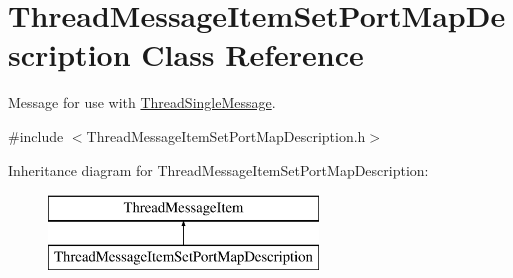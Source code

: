 \hypertarget{class_thread_message_item_set_port_map_description}{
\section{ThreadMessageItemSetPortMapDescription Class Reference}
\label{class_thread_message_item_set_port_map_description}
}


Message for use with \hyperlink{class_thread_single_message}{ThreadSingleMessage}.  




{\ttfamily \#include $<$ThreadMessageItemSetPortMapDescription.h$>$}

Inheritance diagram for ThreadMessageItemSetPortMapDescription:\begin{figure}[H]
\begin{center}
\leavevmode
\includegraphics[height=2.000000cm]{class_thread_message_item_set_port_map_description}
\end{center}
\end{figure}

